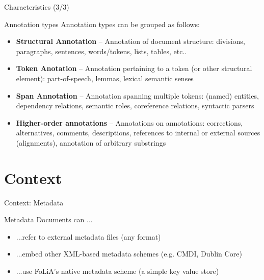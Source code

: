 \documentclass[xcolor=table,10pt,t]{beamer}
\begin{document}
\begin{frame}{Characteristics (3/3)}
    \begin{block}{Annotation types}
        Annotation types can be grouped as follows:
        \begin{itemize}
            \item \textbf{Structural Annotation} -- Annotation of document structure: divisions, paragraphs, sentences, words/tokens, lists, tables, etc..
            \item \textbf{Token Anotation} -- Annotation pertaining to a token (or other structural element): part-of-speech, lemmas, lexical semantic senses
            \item \textbf{Span Annotation} -- Annotation spanning multiple tokens: (named) entities, dependency relations, semantic roles, coreference relations, syntactic parsers
            \item \textbf{Higher-order annotations} -- Annotations on annotations: corrections, alternatives, comments, descriptions, references to internal or external sources (alignments), annotation of arbitrary substrings
        \end{itemize}
    \end{block}
\end{frame}


\section{Context}

\begin{frame}{Context: Metadata}
  \begin{block}{Metadata}
        Documents can ...
        \begin{itemize}
            \item ...refer to external metadata files (any format)
            \item ...embed other XML-based metadata schemes (e.g.  CMDI, Dublin Core)
            \item ...use FoLiA's native metadata scheme (a simple key value store)
        \end{itemize}
  \end{block}
\end{frame}
\end{document}
